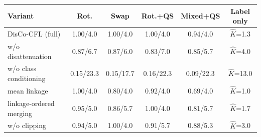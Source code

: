 \begin{tabular}{lccccc}
\toprule
Variant & Rot. & Swap & Rot.+QS & Mixed+QS & Label only \\
\midrule
DisCo-CFL (full) & 1.00/4.0 & 1.00/4.0 & 1.00/4.0 & 0.94/4.0 & $\hat K$=1.3 \\
w/o disattenuation & 0.87/6.7 & 0.87/6.0 & 0.83/7.0 & 0.85/5.7 & $\hat K$=4.0 \\
w/o class conditioning & 0.15/23.3 & 0.15/17.7 & 0.16/22.3 & 0.09/22.3 & $\hat K$=13.0 \\
mean linkage & 1.00/4.0 & 0.80/4.0 & 0.92/4.0 & 0.69/4.0 & $\hat K$=1.0 \\
linkage-ordered merging & 0.95/5.0 & 0.86/5.7 & 1.00/4.0 & 0.81/5.7 & $\hat K$=1.7 \\
w/o clipping & 0.94/5.0 & 1.00/4.0 & 0.91/5.7 & 0.88/5.3 & $\hat K$=3.0 \\
\bottomrule
\end{tabular}
